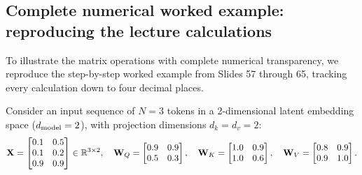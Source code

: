 \documentclass[../../../main.tex]{subfiles}
\begin{document}
\subsection{Complete numerical worked example: reproducing the lecture calculations}
\label{subsec:numerical_worked_walkthrough_ch5}

To illustrate the matrix operations with complete numerical transparency, we reproduce the step-by-step worked example from Slides 57 through 65, tracking every calculation down to four decimal places.

Consider an input sequence of $N = 3$ tokens in a 2-dimensional latent embedding space ($d_{\text{model}} = 2$), with projection dimensions $d_k = d_v = 2$:
\begin{equation}
\label{eq:numerical_example_inputs}
\mathbf{X} = \begin{bmatrix}
0.1 & 0.5 \\
0.1 & 0.2 \\
0.9 & 0.9
\end{bmatrix} \in \mathbb{R}^{3 \times 2}, \quad
\mathbf{W}_Q = \begin{bmatrix}
0.9 & 0.9 \\
0.5 & 0.3
\end{bmatrix}, \quad
\mathbf{W}_K = \begin{bmatrix}
1.0 & 0.9 \\
1.0 & 0.6
\end{bmatrix}, \quad
\mathbf{W}_V = \begin{bmatrix}
0.8 & 0.9 \\
0.9 & 1.0
\end{bmatrix}.
\end{equation}
\end{document}
